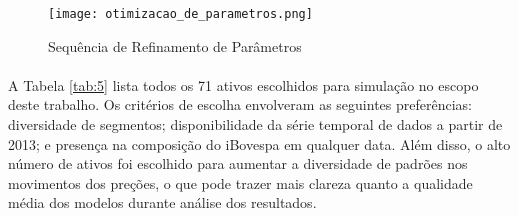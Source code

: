 \begin{figure}[!htb]
    \texttt{[image: otimizacao\_de\_parametros.png]}
    \centering
    \caption{Sequência de Refinamento de Parâmetros}
    \label{fig:444}
\end{figure}

\paragraph{} A Tabela \ref{tab:5} lista todos os 71 ativos escolhidos para simulação no escopo deste trabalho. Os critérios de escolha envolveram as seguintes preferências: diversidade de segmentos; disponibilidade da série temporal de dados a partir de 2013; e presença na composição do iBovespa em qualquer data. Além disso, o alto número de ativos foi escolhido para aumentar a diversidade de padrões nos movimentos dos preções, o que pode trazer mais clareza quanto a qualidade média dos modelos durante análise dos resultados.



